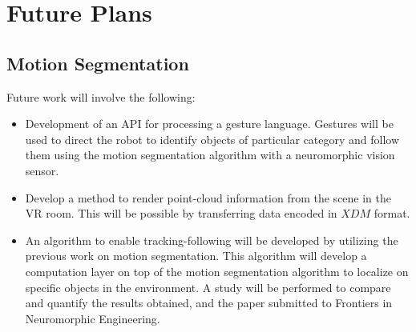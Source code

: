 \chapter{Future Plans}
\section{Motion Segmentation }
Future work will involve the following:
\begin{itemize}
	\item Development of an API for processing a gesture language. Gestures will be used to direct the robot to identify objects of particular category and follow them using the motion segmentation algorithm with a neuromorphic vision sensor.
	
	\item Develop a method to render point-cloud information from the scene in the VR room. This will be possible by transferring data encoded in $XDM$ format.
	
	\item An algorithm to enable tracking-following will be developed by utilizing the previous work on motion segmentation. This algorithm will develop a computation layer on top of the motion segmentation algorithm to localize on specific objects in the environment. A study will be performed to compare and quantify the results obtained, and the paper submitted to Frontiers in Neuromorphic Engineering. 
\end{itemize}


